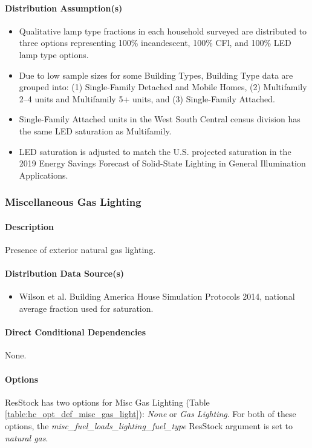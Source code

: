 \paragraph{Distribution Assumption(s)}\label{assumption-67}

\begin{itemize}
 
\item
  Qualitative lamp type fractions in each household surveyed are
  distributed to three options representing 100\% incandescent, 100\%
  CFl, and 100\% LED lamp type options.
\item
  Due to low sample sizes for some Building Types, Building Type data
  are grouped into: (1) Single-Family Detached and Mobile Homes, (2)
  Multifamily 2--4 units and Multifamily 5+ units, and (3) Single-Family
  Attached.
\item
  Single-Family Attached units in the West South Central census division
  has the same LED saturation as Multifamily.
\item
  LED saturation is adjusted to match the U.S. projected saturation in
  the 2019 Energy Savings Forecast of Solid-State Lighting in General
  Illumination Applications.
\end{itemize}

\subsubsection{Miscellaneous Gas Lighting}\label{misc_gas_lighting}
\paragraph{Description}
Presence of exterior natural gas lighting.
\paragraph{Distribution Data Source(s)}
\begin{itemize}
 
\item
  Wilson et al. \textquotesingle Building America House Simulation
  Protocols\textquotesingle{} 2014, national average fraction used for
  saturation.
\end{itemize}
\paragraph{Direct Conditional Dependencies}
None.
\paragraph{Options}
ResStock has two options for Misc Gas Lighting (Table \ref{table:hc_opt_def_misc_gas_light}): \textit{None} or \textit{Gas Lighting}. For both of these options, the \textit{misc\_fuel\_loads\_lighting\_fuel\_type} ResStock argument is set to \textit{natural gas}.

